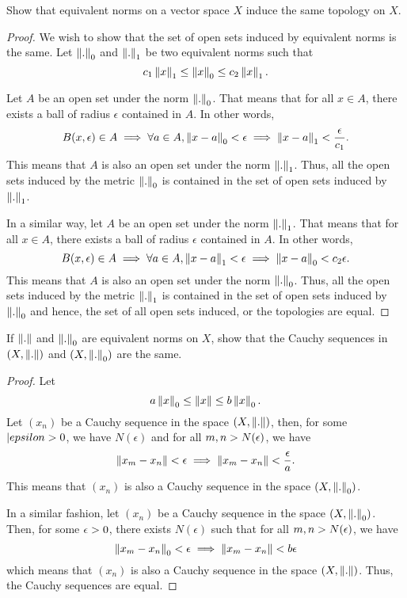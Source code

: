 \begin{question}
    Show that equivalent norms on a vector space $X$ induce the same topology on $X$.
    \label{section2.4-4}
\end{question}
\begin{proof}
    We wish to show that the set of open sets induced by equivalent norms is the same. Let $\left\lVert . \right\rVert_0$ and $\left\lVert . \right\rVert_1$ be two equivalent norms such that 
    \[c_1\left\lVert x \right\rVert_1 \leq \left\lVert x \right\rVert_0 \leq c_2 \left\lVert x \right\rVert_1.\]
   

    Let $A$ be an open set under the norm $\left\lVert . \right\rVert_0$. That means that for all $x \in A$, there exists a ball of radius $\epsilon$ contained in $A$. In other words,
    \[B(x , \epsilon) \in A \implies \forall  a\in A , \left\lVert x - a \right\rVert_0 < \epsilon \implies \left\lVert x-a \right\rVert_1 < \frac{\epsilon}{c_1}.\]
    This means that $A$ is also an open set under the norm $\left\lVert . \right\rVert_1$. Thus, all the open sets induced by the metric $\left\lVert . \right\rVert_0$ is contained in the set of open sets induced by $\left\lVert . \right\rVert_{1}$.

    In a similar way, let $A$ be an open set under the norm $\left\lVert . \right\rVert_1$. That means that for all $x \in A$, there exists a ball of radius $\epsilon$ contained in $A$. In other words,
    \[B(x , \epsilon) \in A \implies \forall  a\in A , \left\lVert x - a \right\rVert_1 < \epsilon \implies \left\lVert x-a \right\rVert_0 < c_2\epsilon.\]
    This means that $A$ is also an open set under the norm $\left\lVert . \right\rVert_0$. Thus, all the open sets induced by the metric $\left\lVert . \right\rVert_1$ is contained in the set of open sets induced by $\left\lVert . \right\rVert_{0}$ and hence, the set of all open sets induced, or the topologies are equal.
\end{proof}

\begin{question}
    If $\left\lVert . \right\rVert$ and $\left\lVert . \right\rVert_0$ are equivalent norms on $X$, show that the Cauchy sequences in $(X , \left\lVert . \right\rVert)$ and $(X , \left\lVert . \right\rVert_0)$ are the same.
    \label{section2.4-5}
\end{question}
\begin{proof}
    Let 
    \[a\left\lVert x \right\rVert_0 \leq \left\lVert x \right\rVert \leq b\left\lVert x \right\rVert_0.\]
    Let $(x_n)$ be a Cauchy sequence in the space $(X , \left\lVert . \right\rVert)$, then, for some $|epsilon > 0$, we have $N(\epsilon)$ and for all $m,n > N(\epsilon)$, we have
    \[\left\lVert x_m - x_n \right\rVert < \epsilon \implies \left\lVert x_m - x_n \right\rVert < \frac{\epsilon}{a}.\]
    This means that $(x_n)$ is also a Cauchy sequence in the space $(X , \left\lVert . \right\rVert_0)$.

    In a similar fashion, let $(x_n)$ be a Cauchy sequence in the space $(X , \left\lVert . \right\rVert_0)$. Then, for some $\epsilon > 0$, there exists $N(\epsilon)$ such that for all $m , n > N(\epsilon)$, we have
    \[\left\lVert x_m - x_n \right\rVert_0 < \epsilon \implies \left\lVert x_m - x_n \right\rVert < b\epsilon\]
    which means that $(x_n)$ is also a Cauchy sequence in the space $(X , \left\lVert . \right\rVert)$. Thus, the Cauchy sequences are equal.
\end{proof}

